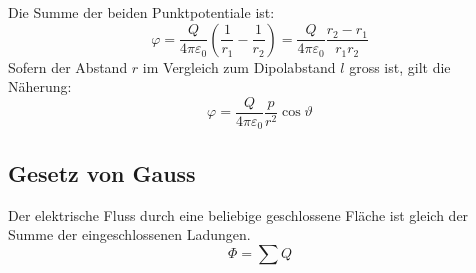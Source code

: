 \begin{center}

\end{center}

Die Summe der beiden Punktpotentiale ist:
\[
	\varphi
		= \frac{Q}{4\pi\varepsilon_0} \left(\frac{1}{r_1} - \frac{1}{r_2}\right)
		= \frac{Q}{4\pi\varepsilon_0} \frac{r_2 - r_1}{r_1 r_2}
\]
Sofern der Abstand $r$ im Vergleich zum Dipolabstand $l$ gross ist, gilt die
Näherung:
\[
	\varphi = \frac{Q}{4\pi\varepsilon_0} \frac{p}{r^2} \cos \vartheta
\]

\subsection{Gesetz von Gauss}

Der elektrische Fluss durch eine beliebige geschlossene Fläche ist gleich der
Summe der eingeschlossenen Ladungen.
\[
	\Phi = \sum Q
\]
